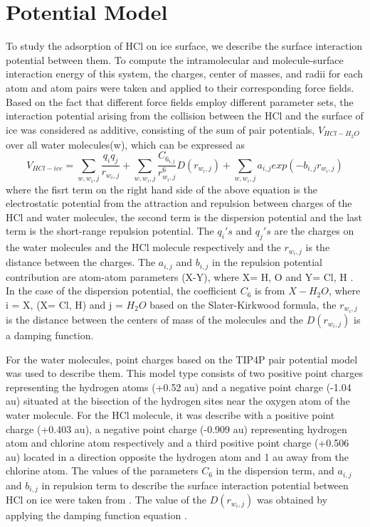 \documentclass[a4paper,11pt]{report}
\begin{document}
\section{Potential Model}
To study the adsorption of HCl on ice surface, we describe the surface interaction potential between them. To compute the intramolecular and molecule-surface interaction energy of this system, the charges, center of masses, and radii for each atom and atom pairs were taken and applied to their corresponding force fields. Based on the fact that different force fields employ different parameter sets, the interaction potential arising from the collision between the HCl and the surface of ice was considered as additive, consisting of the sum of pair potentials, $V_{HCl-H_{2}O}$ over all water molecules(w), which can be expressed as
\begin{equation}\label{aede3}
V_{HCl-ice} =  \sum_{w,w_{i},j}\frac{q_{i}q_{j}}{r_{w_{i},j}} + \sum_{w,w_{i},j}\frac{C_{6_{i,j}}}{r_{w_{i},j}^{6}}D(r_{w_{i},j}) + \sum_{w,w_{i},j}a_{i,j}exp(-b_{i,j}r_{w_{i},j})
\end{equation}
where the fisrt term on the right hand side of the above equation is the electrostatic potential from the attraction and repulsion between charges of the HCl and water molecules, the second term is the dispersion potential and the last term is the short-range repulsion potential. The $q_{i}'s$ and $q_{j}'s$ are the charges on the water molecules and the HCl molecule respectively and the $r_{w_{i},j}$ is the distance between the charges. The $a_{i,j}$ and $b_{i,j}$ in the repulsion potential contribution are atom-atom parameters (X-Y), where X= H, O and Y= Cl, H . In the case of the dispersion potential, the coefficient $C_{6}$ is from $X-H_{2}O$, where i = X, (X= Cl, H) and j = $H_{2}O$ based on the Slater-Kirkwood formula, the $r_{w_{i},j}$ is the distance between the centers of mass of the molecules and the $D(r_{w_{i},j})$ is a damping function.

For the water molecules, point charges based on the TIP4P pair potential model \citep{jorgensen1983comparison} was used to describe them. This model type consists of two positive point charges representing the hydrogen atoms (+0.52 au) and a negative point charge (-1.04 au) situated at the bisection of the hydrogen sites near the oxygen atom of the water molecule. For the HCl molecule, it was describe with a positive point charge (+0.403 au), a negative point charge (-0.909 au) representing hydrogen atom and chlorine atom respectively and a third positive point charge (+0.506 au) located in a direction opposite the hydrogen atom and 1 au away from the chlorine atom. The values of the parameters $C_{6}$ in the dispersion term, and $a_{i,j}$ and $b_{i,j}$ in repulsion term to describe the surface interaction potential between HCl on ice were taken from \citep{woittequand2007classical}. The value of the $D(r_{w_{i},j})$ was obtained by applying the damping function equation \citep{kroes1992sticking}.







\end{document}
